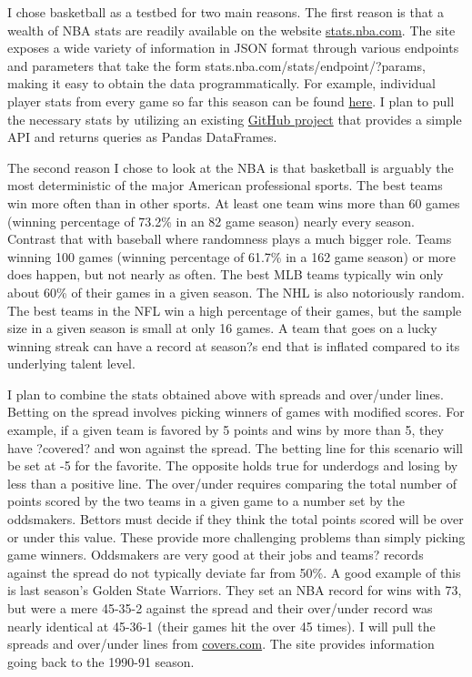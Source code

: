 \documentclass{article}
\begin{document}
I chose basketball as a testbed for two main reasons. The first reason is that a wealth of NBA stats are readily available on the website \url{stats.nba.com}. The site exposes a wide variety of information in JSON format through various endpoints and parameters that take the form stats.nba.com/stats/{endpoint}/?{params}, making it easy to obtain the data programmatically. For example, individual player stats from every game so far this season can be found \href{http://stats.nba.com/stats/leaguegamelog/?LeagueID=00&Season=2016-17&SeasonType=Regular\%20Season&PlayerOrTeam=P&Sorter=PTS&Direction=DESC}{here}. I plan to pull the necessary  stats by utilizing an existing \href{https://github.com/seemethere/nba_py}{GitHub project} that provides a simple API and returns queries as Pandas DataFrames.

The second reason I chose to look at the NBA is that basketball is arguably the most deterministic of the major American professional sports. The best teams win more often than in other sports. At least one team wins more than 60 games (winning percentage of 73.2\% in an 82 game season) nearly every season. Contrast that with baseball where randomness plays a much bigger role. Teams winning 100 games (winning percentage of 61.7\% in a 162 game season) or more does happen, but not nearly as often. The best MLB teams typically win only about 60\% of their games in a given season. The NHL is also notoriously random. The best teams in the NFL win a high percentage of their games, but the sample size in a given season is small at only 16 games. A team that goes on a lucky winning streak can have a record at season?s end that is inflated compared to its underlying talent level.

I plan to combine the stats obtained above with spreads and over/under lines. Betting on the spread involves picking winners of games with modified scores. For example, if a given team is favored by 5 points and wins by more than 5, they have ?covered? and won against the spread. The betting line for this scenario will be set at -5 for the favorite. The opposite holds true for underdogs and losing by less than a positive line. The over/under requires comparing the total number of points scored by the two teams in a given game to a number set by the oddsmakers. Bettors must decide if they think the total points scored will be over or under this value. These provide more challenging problems than simply picking game winners. Oddsmakers are very good at their jobs and teams? records against the spread do not typically deviate far from 50\%. A good example of this is last season's Golden State Warriors. They set an NBA record for wins with 73, but were a mere 45-35-2 against the spread and their over/under record was nearly identical at 45-36-1 (their games hit the over 45 times). I will pull the spreads and over/under lines from \url{covers.com}. The site provides information going back to the 1990-91 season.
\end{document}
